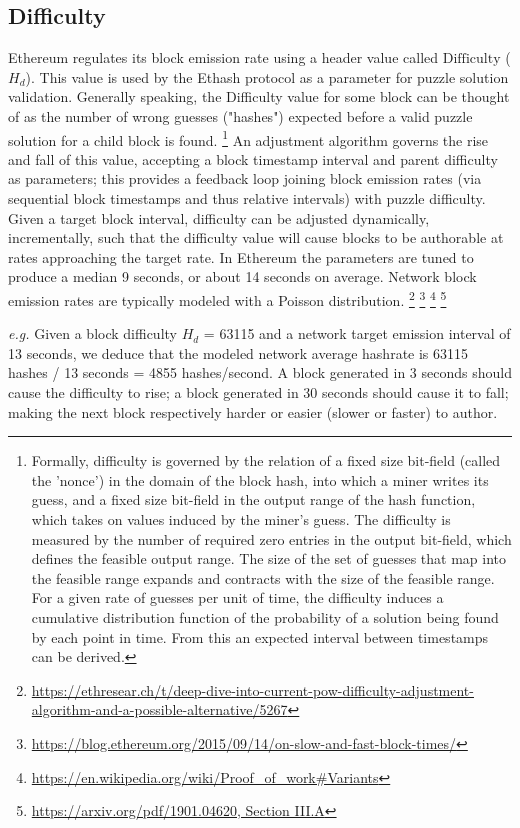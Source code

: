 \documentclass[11pt]{article}
\begin{document}
	\subsection{\small{Difficulty}}
	Ethereum regulates its block emission rate using a header value called
	$\mathrm{Difficulty}$ ($H_d$). This value is used by the Ethash protocol as a
	parameter for puzzle solution validation. Generally speaking, the Difficulty
	value for some block can be thought of as the number of wrong guesses
	("hashes") expected before a valid puzzle solution for a child block is
	found.\nolinebreak
	\footnote{Formally, difficulty is governed by the relation of a fixed size
	bit-field (called the 'nonce') in the domain of the block hash, into which a
	miner writes its guess, and a fixed size bit-field in the output range of the
	hash function, which takes on values induced by the miner's guess. The
	difficulty is measured by the number of required zero entries in the output
	bit-field, which defines the feasible output range.  The size of the set of
	guesses that map into the feasible range expands and contracts with the size of
	the feasible range. For a given rate of guesses per unit of time, the
	difficulty induces a cumulative distribution function of the probability of a
	solution being found by each point in time. From this an expected interval
	between timestamps can be derived.}
	An adjustment algorithm governs the rise and fall of this value, accepting a
	block timestamp interval and parent difficulty as parameters;
	this provides a feedback loop joining block emission rates (via sequential
	block timestamps and thus relative intervals) with puzzle difficulty.
	Given a target block interval, difficulty can be adjusted dynamically,
	incrementally, such that the difficulty value will cause blocks to be authorable
	at rates approaching the target rate.
	In Ethereum the parameters are tuned to produce a median 9 seconds, or about 14
	seconds on average.
	Network block emission rates are typically modeled with a Poisson
	distribution.\nolinebreak
	\footnote{\url{https://ethresear.ch/t/deep-dive-into-current-pow-difficulty-adjustment-algorithm-and-a-possible-alternative/5267}}\nolinebreak
	\footnote{\url{https://blog.ethereum.org/2015/09/14/on-slow-and-fast-block-times/}}\nolinebreak
	\footnote{\url{https://en.wikipedia.org/wiki/Proof_of_work#Variants}}\nolinebreak
	\footnote{\url{https://arxiv.org/pdf/1901.04620, Section III.A}}

	\textit{e.g.} Given a block difficulty $H_d$ = 63115 and a network target
	emission interval of 13 seconds, we deduce that the modeled network average
	hashrate is 63115 hashes / 13 seconds = 4855 hashes/second. A block generated
	in 3 seconds should cause the difficulty to rise; a block generated in 30
	seconds should cause it to fall; making the next block respectively harder or
	easier (slower or faster) to author.
\end{document}
